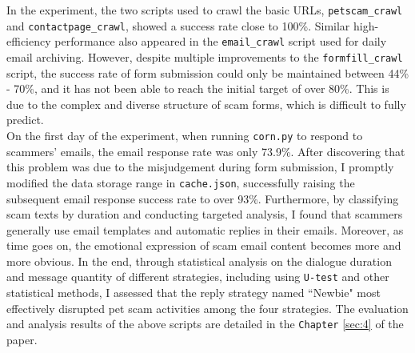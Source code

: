 \documentclass[ oneside,%
                    author={Cassie Qing Tang},
                    degree={BSc},
                     title={An Automated Response System for Disrupting Online Pet Scamming \\ },
                    subtitle={ }]{dissertation}
\begin{document}
In the experiment, the two scripts used to crawl the basic URLs, \texttt{petscam\_crawl} and \texttt{contactpage\_crawl}, showed a success rate close to 100\%. Similar high-efficiency performance also appeared in the \texttt{email\_crawl} script used for daily email archiving. However, despite multiple improvements to the \texttt{formfill\_crawl} script, the success rate of form submission could only be maintained between 44\% - 70\%, and it has not been able to reach the initial target of over 80\%. This is due to the complex and diverse structure of scam forms, which is difficult to fully predict.
\\

On the first day of the experiment, when running \texttt{corn.py} to respond to scammers' emails, the email response rate was only 73.9\%. After discovering that this problem was due to the misjudgement during form submission, I promptly modified the data storage range in \texttt{cache.json}, successfully raising the subsequent email response success rate to over 93\%. Furthermore, by classifying scam texts by duration and conducting targeted analysis, I found that scammers generally use email templates and automatic replies in their emails. Moreover, as time goes on, the emotional expression of scam email content becomes more and more obvious. In the end, through statistical analysis on the dialogue duration and message quantity of different strategies, including using \texttt{U-test} and other statistical methods, I assessed that the reply strategy named ``Newbie" most effectively disrupted pet scam activities among the four strategies. The evaluation and analysis results of the above scripts are detailed in the \texttt{Chapter} \ref{sec:4} of the paper.
\\
\end{document}
